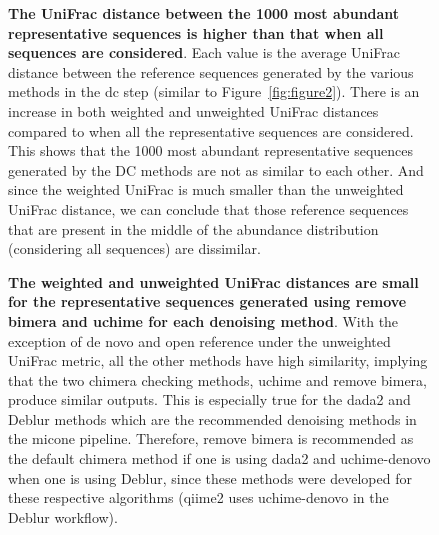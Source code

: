    \begin{figure}[H]
      \centering
        \caption{
          \textbf{The UniFrac distance between the 1000 most abundant representative sequences is higher than that when all sequences are considered}.
          Each value is the average UniFrac distance between the reference sequences generated by the various methods in the \ac{dc} step (similar to Figure~\ref{fig:figure2}).
          There is an increase in both weighted and unweighted UniFrac distances compared to when all the representative sequences are considered.
          This shows that the 1000 most abundant representative sequences generated by the DC methods are not as similar to each other.
          And since the weighted UniFrac is much smaller than the unweighted UniFrac distance, we can conclude that those reference sequences that are present in the middle of the abundance distribution (considering all sequences) are dissimilar.
        }
      \label{fig:figure_s2}
    \end{figure}

    \begin{figure}[H]
      \centering
        \caption{
          \textbf{The weighted and unweighted UniFrac distances are small for the representative sequences generated using remove bimera and uchime for each denoising method}.
          With the exception of de novo and open reference under the unweighted UniFrac metric, all the other methods have high similarity, implying that the two chimera checking methods, uchime and remove bimera, produce similar outputs.
          This is especially true for the \ac{dada2} and Deblur methods which are the recommended denoising methods in the \ac{micone} pipeline.
          Therefore, remove bimera is recommended as the default chimera method if one is using \ac{dada2} and uchime-denovo when one is using Deblur, since these methods were developed for these respective algorithms (\ac{qiime2} uses uchime-denovo in the Deblur workflow).
        }
      \label{fig:figure_s3}
    \end{figure}

